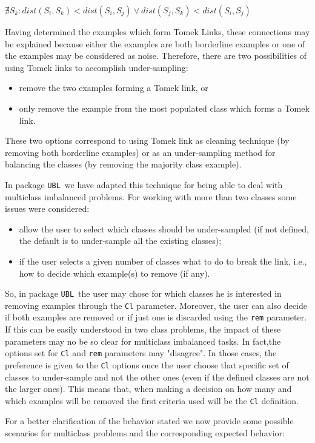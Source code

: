 \documentclass[10pt,a4paper]{article}\usepackage[]{graphicx}\usepackage[]{color}
\newcommand{\UBL}{package \texttt{UBL}\ }
\begin{document}
$\nexists S_k : dist(S_i,S_k) < dist(S_i,S_j) \vee dist(S_j, S_k)<dist(S_i,S_j)$

\noindent Having determined the examples which form Tomek Links, these connections may be explained because either the examples are both borderline examples or one of the examples may be considered as noise.
Therefore, there are two possibilities of using Tomek links to accomplish under-sampling:
\begin{itemize}
  \item remove the two examples forming a Tomek link, or
  \item only remove the example from the most populated class which forms a Tomek link.
\end{itemize}

These two options correspond to using Tomek link as cleaning technique (by removing both borderline examples) or as an under-sampling method for balancing the classes (by removing the majority class example).


In \UBL we have adapted this technique for being able to deal with multiclass imbalanced problems. 
For working with more than two classes some issues were considered: 
\begin{itemize}
\item allow the user to select which classes should be under-sampled (if not defined, the default is to under-sample all the existing classes);
\item if the user selects a given number of classes what to do to break the link, i.e., how to decide which example(s) to remove (if any). 
\end{itemize}
So, in \UBL the user may chose for which classes he is interested in removing examples through the \texttt{Cl} parameter. Moreover, the user can also decide if both examples are removed or if just one is discarded using the \texttt{rem} parameter. If this can be easily understood in two class problems, the impact of these parameters may no be so clear for multiclass imbalanced tasks. 
In fact,the options set for \texttt{Cl} and \texttt{rem} parameters may "disagree". In those cases, the preference is given to the \texttt{Cl} options once the user choose that specific set of classes to under-sample and not the other ones (even if the defined classes are not the larger ones). This means that, when making a decision on how many and which examples will be removed the first criteria used will be the \texttt{Cl} definition.


For a better clarification of the behavior stated we now provide some possible scenarios for multiclass problems and the corresponding expected behavior:
\end{document}
